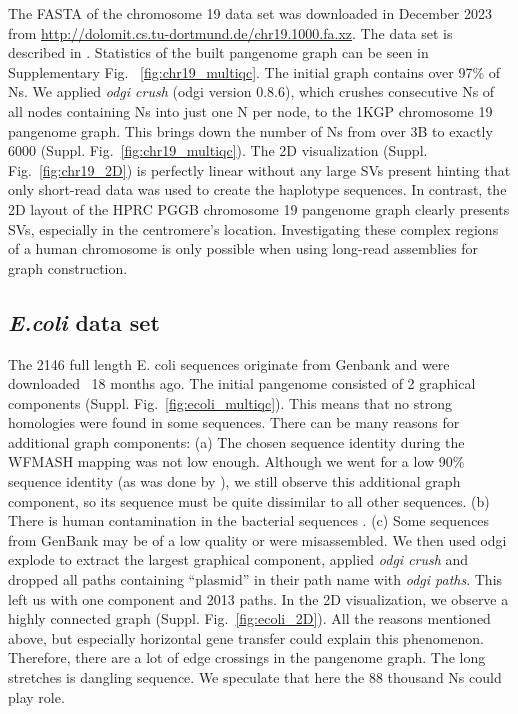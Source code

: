 \documentclass{bioinfo}
\theoremstyle{definition}
\begin{document}
	The FASTA of the chromosome 19 data set was downloaded in December 2023 from \href{http://dolomit.cs.tu-dortmund.de/chr19.1000.fa.xz}{http://dolomit.cs.tu-dortmund.de/chr19.1000.fa.xz}. The data set is described in \citep{Kuhnle2020}. Statistics of the built pangenome graph can be seen in Supplementary Fig. ~\ref{fig:chr19_multiqc}. The initial graph contains over 97\% of Ns. We applied \textit{odgi crush} (odgi version 0.8.6), which crushes consecutive Ns of all nodes containing Ns into just one N per node, to the 1KGP chromosome 19 pangenome graph. This brings down the number of Ns from over 3B to exactly 6000 (Suppl. Fig.~\ref{fig:chr19_multiqc}). 
	The 2D visualization (Suppl. Fig.~\ref{fig:chr19_2D}) is perfectly linear without any large SVs present hinting that only short-read data was used to create the haplotype sequences.
	In contrast, the 2D layout of the HPRC PGGB chromosome 19 pangenome graph \citep{Heumos2023} clearly presents SVs, especially in the centromere's location. Investigating these complex regions of a human chromosome is only possible when using long-read assemblies for graph construction.
	
	
	
	
	\subsection{\textit{E.coli} data set}
	
	The 2146 full length E. coli sequences originate from Genbank \citep{Sayers2021} and were downloaded ~18 months ago. The initial pangenome consisted of 2 graphical components (Suppl. Fig.~\ref{fig:ecoli_multiqc}). This means that no strong homologies were found in some sequences. There can be many reasons for additional graph components: (a) The chosen sequence identity during the WFMASH mapping was not low enough. Although we went for a low 90\% sequence identity (as was done by \cite{Garrison2023}), we still observe this additional graph component, so its sequence must be quite dissimilar to all other sequences. (b) There is human contamination in the bacterial sequences \citep{Breitwieser2019}. (c) Some sequences from GenBank may be of a low quality or were misassembled. We then used odgi explode to extract the largest graphical component, applied \textit{odgi crush} and dropped all paths containing “plasmid” in their path name with \textit{odgi paths}. This left us with one component and 2013 paths.
	In the 2D visualization, we observe a highly connected graph (Suppl. Fig.~\ref{fig:ecoli_2D}). All the reasons mentioned above, but especially horizontal gene transfer could explain this phenomenon. Therefore, there are a lot of edge crossings in the pangenome graph. The long stretches is dangling sequence. We speculate that here the 88 thousand Ns could play role.
	
	
	
	
\end{document}
